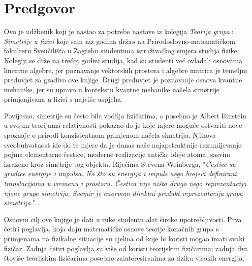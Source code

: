

\thispagestyle{empty}

\hspace*{10ex}
\section*{Predgovor}

Ovo je udžbenik koji je nastao za potrebe nastave iz 
kolegija \emph{Teorija grupa} i \emph{Simetrije u fizici} koje
sam niz godina držao na Prirodoslovno-matematičkom fakultetu
Sveučilišta u Zagrebu studentima istraživačkog smjera studija fizike.
Kolegiji se drže na trećoj godini studija, kad
su studenti već ovladali osnovama linearne algebre, jer poznavanje
vektorskih prostora i algebre matrica je temeljni preduvjet za
gradivo ove knjige. Drugi preduvjet je poznavanje osnova kvantne
mehanike, jer su upravo u kontekstu kvantne mehanike načela simetrije
primjenjivana u fizici s najviše uspjeha.


Povijesno, simetrije su često bile vodilja fizičarima, a posebno
je Albert Einstein u svojim teorijama relativnosti pokazao do je koje
mjere moguće ostvariti nove spoznaje o prirodi konzistentnom primjenom
načela simetrija.
Njihova sveobuhvatnost ide do te mjere da je danas naše najapstraktnije
razumijevanje pojma elementarne čestice, moderne realizacije antičke ideje atoma, 
sasvim izraženo kroz simetrije tog objekta. Riječima 
Stevena Weinberga, "\emph{Čestice su grudice energije i impulsa. No što su
energija i impuls nego brojevi definirani translacijama u
vremenu i prostoru. Čestica nije ništa drugo nego
reprezentacija njene grupe simetrija. Svemir je enorman direktni produkt 
reprezentacija grupa simetrija.}" \cite{Crease:1996}.

Osnovni cilj ove knjige je dati u ruke studentu alat široke
upotrebljivosti. Prva četiri poglavlja, koja daju matematičke
osnove teorije konačnih grupa s primjenama na fizikalne situacije
su cjelina od koje bi koristi mogao imati svaki fizičar. 
Zadnja četiri poglavlja su više od koristi teorijskim fizičarima;
zadnja dva štoviše teorijskim fizičarima posebno zainteresiranima za
fiziku visokih energija.

\begin{flushleft}
\end{flushleft}
